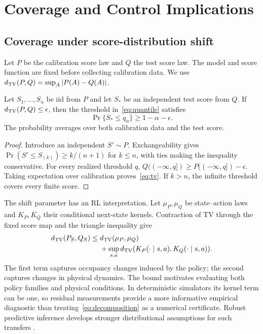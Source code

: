 \section{Coverage and Control Implications}
\subsection{Coverage under score-distribution shift}
Let $P$ be the calibration score law and $Q$ the test score law. The model
and score function are fixed before collecting calibration data. We use
$d_{\mathrm{TV}}(P,Q)=\sup_A|P(A)-Q(A)|$.

\begin{theorem}
Let $S_1,\ldots,S_n$ be iid from $P$ and let $S_*$ be an independent
test score from $Q$. If $d_{\mathrm{TV}}(P,Q)\leq\epsilon$, then the threshold
in~\eqref{eq:quantile} satisfies
\begin{equation}
 \Pr\{S_*\leq q_\alpha\}\geq 1-\alpha-\epsilon.
 \label{eq:tv}
\end{equation}
The probability averages over both calibration data and the test score.
\end{theorem}
\begin{proof}
Introduce an independent $S'\sim P$. Exchangeability gives
$\Pr(S'\leq S_{(k)})\geq k/(n+1)$ for $k\leq n$, with ties
making the inequality conservative. For every realized threshold $q$,
$Q(({-\infty},q])\geq P(({-\infty},q])-\epsilon$.
Taking expectation over calibration proves~\eqref{eq:tv}. If $k>n$,
the infinite threshold covers every finite score.
\end{proof}

The shift parameter has an RL interpretation. Let $\mu_P,\mu_Q$ be
state--action laws and $K_P,K_Q$ their conditional next-state kernels.
Contraction of TV through the fixed score map and the triangle inequality
give
\begin{equation}
 \begin{split}
 d_{\mathrm{TV}}(P_S,Q_S)\leq{}&d_{\mathrm{TV}}(\mu_P,\mu_Q)\\
 &+\sup_{s,a}d_{\mathrm{TV}}(K_P(\cdot\mid s,a),K_Q(\cdot\mid s,a)).
 \end{split}
 \label{eq:decomposition}
\end{equation}
The first term captures occupancy changes induced by the policy; the second
captures changes in physical dynamics. The bound motivates evaluating both
policy families and physical conditions. In deterministic simulators its
kernel term can be one, so residual measurements provide a more informative
empirical diagnostic than treating~\eqref{eq:decomposition} as a numerical
certificate. Robust predictive inference develops stronger distributional
assumptions for such transfers \cite{cauchois2024robust,barber2023beyond}.

